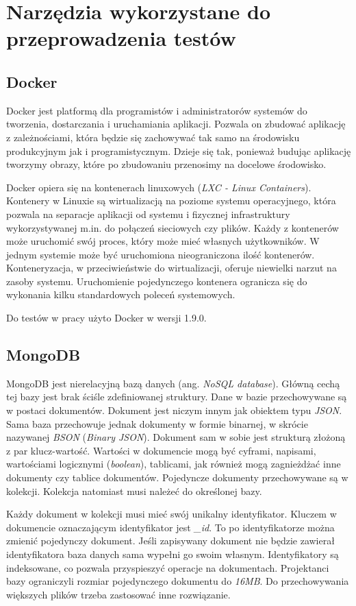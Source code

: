 \chapter{Narzędzia wykorzystane do przeprowadzenia testów}

\section{Docker}
Docker \cite{docker} jest platformą dla programistów i administratorów systemów do tworzenia, dostarczania i uruchamiania aplikacji. Pozwala on zbudować aplikację z zależnościami, która  będzie się zachowywać tak samo na środowisku produkcyjnym jak i programistycznym. Dzieje się tak, ponieważ budując aplikację tworzymy obrazy, które po zbudowaniu przenosimy na docelowe środowisko.

Docker opiera się na kontenerach linuxowych (\textsl{LXC - Linux Containers}). Kontenery w Linuxie są wirtualizacją na poziome systemu operacyjnego, która pozwala na separacje aplikacji od systemu i fizycznej infrastruktury wykorzystywanej m.in. do połączeń sieciowych czy plików. Każdy z kontenerów może uruchomić swój proces, który może mieć własnych użytkowników. W jednym systemie może być uruchomiona nieograniczona ilość kontenerów. Konteneryzacja, w przeciwieństwie do wirtualizacji, oferuje niewielki narzut na zasoby systemu. Uruchomienie pojedynczego kontenera ogranicza się do wykonania kilku standardowych poleceń systemowych.

Do testów w pracy użyto Docker w wersji 1.9.0.

\section{MongoDB}
MongoDB \cite{mongodb} jest nierelacyjną bazą danych (ang. \textsl{NoSQL database}). Główną cechą tej bazy jest brak ściśle zdefiniowanej struktury. Dane w bazie przechowywane są w postaci dokumentów. Dokument jest niczym innym jak obiektem typu \textsl{JSON}. Sama baza  przechowuje jednak dokumenty w formie binarnej, w skrócie nazywanej \textsl{BSON} (\textsl{Binary JSON}). Dokument sam w sobie jest strukturą złożoną z par klucz-wartość. Wartości w dokumencie mogą być cyframi, napisami, wartościami logicznymi (\textsl{boolean}), tablicami, jak również mogą zagnieżdżać inne dokumenty czy tablice dokumentów. Pojedyncze dokumenty przechowywane są w kolekcji. Kolekcja natomiast musi należeć do określonej bazy.

Każdy dokument w kolekcji musi mieć swój unikalny identyfikator. Kluczem w dokumencie oznaczającym identyfikator jest \textsl{\_id}. To po identyfikatorze można zmienić pojedynczy dokument. Jeśli zapisywany dokument nie będzie zawierał identyfikatora baza danych sama wypełni go swoim własnym. Identyfikatory są indeksowane, co pozwala przyspieszyć operacje na dokumentach. Projektanci bazy ograniczyli rozmiar pojedynczego dokumentu do \textsl{16MB}. Do przechowywania większych plików trzeba zastosować inne rozwiązanie.

